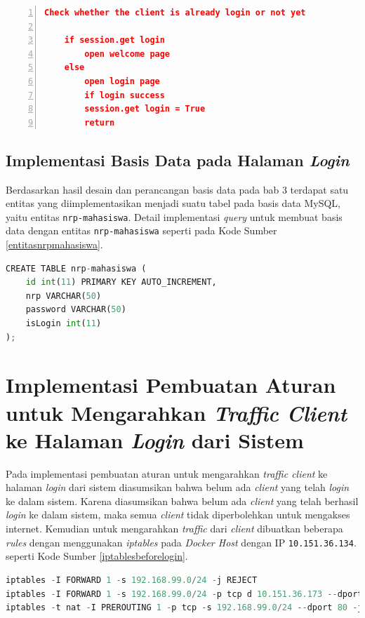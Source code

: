 \begin{minipage}{\linewidth}  
	\begin{lstlisting}[numbers=left, frame=single,tabsize=2,breaklines,caption={Pseudocode Web Service},label=pseudocodehalamanlogin,language=json]
	Check whether the client is already login or not yet
	
	if session.get login
		open welcome page
	else
		open login page
		if login success
		session.get login = True	  
		return  	
	\end{lstlisting}
\end{minipage}


\subsection{Implementasi Basis Data pada Halaman \textit{Login}}
Berdasarkan hasil desain dan perancangan basis data pada bab 3 terdapat satu entitas yang diimplementasikan menjadi suatu tabel pada basis data MySQL, yaitu entitas \texttt{nrp-mahasiswa}. Detail implementasi \textit{query} untuk membuat basis data dengan entitas \texttt{nrp-mahasiswa} seperti pada Kode Sumber \ref{entitasnrpmahasiswa}.\\
\begin{lstlisting}[frame=single,tabsize=2,breaklines,captionpos=b,language=python, caption=\textit{Query} untuk membuat tabel testing,label=entitasnrpmahasiswa]
CREATE TABLE nrp-mahasiswa (
	id int(11) PRIMARY KEY AUTO_INCREMENT,
	nrp VARCHAR(50)
	password VARCHAR(50)
	isLogin int(11)
);
\end{lstlisting}


\section{Implementasi Pembuatan Aturan untuk Mengarahkan \textit{Traffic Client} ke Halaman \textit{Login} dari Sistem}
Pada implementasi pembuatan aturan untuk mengarahkan \textit{traffic client} ke halaman \textit{login} dari sistem diasumsikan bahwa belum ada \textit{client} yang telah \textit{login} ke dalam sistem. Karena diasumsikan bahwa belum ada \textit{client} yang telah berhasil \textit{login} ke dalam sistem, maka semua \textit{client} tidak diperbolehkan untuk mengakses internet. Kemudian untuk mengarahkan \textit{traffic} dari \textit{client} dibuatkan beberapa \textit{rules} dengan menggunakan \textit{iptables} pada \textit{Docker Host} dengan IP \texttt{10.151.36.134}. seperti Kode Sumber \ref{iptablesbeforelogin}.
\begin{lstlisting}[frame=single,tabsize=2,breaklines,captionpos=b,caption=Command untuk mengarahkan \textit{client} ke halaman \textit{login},language=Python,label=iptablesbeforelogin]
iptables -I FORWARD 1 -s 192.168.99.0/24 -j REJECT
iptables -I FORWARD 1 -s 192.168.99.0/24 -p tcp d 10.151.36.173 --dport 4000 -j ACCEPT
iptables -t nat -I PREROUTING 1 -p tcp -s 192.168.99.0/24 --dport 80 -j DNAT --to 10.151.36.173:4000
\end{lstlisting}

